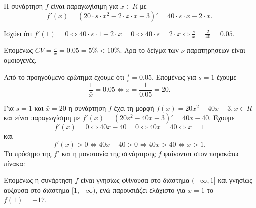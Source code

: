 
\begin{alist}
\item Η συνάρτηση $f$ είναι παραγωγίσιμη για $x \in R$ με
\[ f'(x) = (20 \cdot s \cdot x^2 - 2 \cdot \bar{x} \cdot x + 3)' = 40 \cdot s \cdot x - 2 \cdot \bar{x}. \]

\item Ισχύει ότι $f'(1) = 0 \Leftrightarrow 40 \cdot s \cdot 1 - 2 \cdot \bar{x} = 0 \Leftrightarrow 40 \cdot s = 2 \cdot \bar{x} \Leftrightarrow \frac{s}{\bar{x}} = \frac{2}{40} = 0.05$.

Επομένως $CV = \frac{s}{\bar{x}} = 0.05 = 5\% < 10\%$. Άρα το δείγμα των $\nu$ παρατηρήσεων είναι ομοιογενές.

\item Από το προηγούμενο ερώτημα έχουμε ότι $\frac{s}{\bar{x}} = 0.05$. Επομένως για $s = 1$ έχουμε
\[ \frac{1}{\bar{x}} = 0.05 \Leftrightarrow \bar{x} = \frac{1}{0.05} = 20. \]

\item Για $s=1$ και $\bar{x} = 20$ η συνάρτηση $f$ έχει τη μορφή $f(x) = 20x^2 - 40x + 3, x \in R$ και είναι παραγωγίσιμη με $f'(x) = (20x^2 - 40x + 3)' = 40x - 40$. Έχουμε
\[ f'(x) = 0 \Leftrightarrow 40x - 40 = 0 \Leftrightarrow 40x = 40 \Leftrightarrow x = 1 \]
και
\[ f'(x) > 0 \Leftrightarrow 40x - 40 > 0 \Leftrightarrow 40x > 40 \Leftrightarrow x > 1. \]
Το πρόσημο της $f'$ και η μονοτονία της συνάρτησης $f$ φαίνονται στον παρακάτω πίνακα:

\begin{center}
\end{center}

Επομένως η συνάρτηση $f$ είναι γνησίως φθίνουσα στο διάστημα $(-\infty, 1]$ και γνησίως αύξουσα στο διάστημα $[1, +\infty)$, ενώ παρουσιάζει ελάχιστο για $x=1$ το $f(1) = -17$.
\end{alist}


\vspace{6mm}
\restoregeometry


